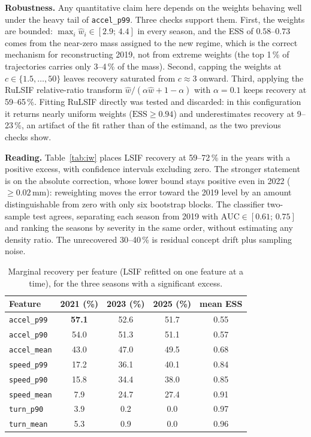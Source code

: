 \documentclass[conference]{IEEEtran}
\begin{document}
\textbf{Robustness.}
Any quantitative claim here depends on the weights behaving well under the
heavy tail of \texttt{accel\_p99}. Three checks support them. First, the
weights are bounded: $\max_i \hat{w}_i \in [2.9;\,4.4]$ in every season, and
the ESS of $0.58$--$0.73$ comes from the near-zero mass assigned to the new
regime, which is the correct mechanism for reconstructing 2019, not from
extreme weights (the top 1\,\% of trajectories carries only 3--4\,\% of the
mass). Second, capping the weights at $c \in \{1.5,\ldots,50\}$ leaves recovery
saturated from $c \approx 3$ onward. Third, applying the RuLSIF relative-ratio
transform $\hat{w}/(\alpha\hat{w}+1-\alpha)$ with $\alpha = 0.1$ keeps recovery
at 59--65\,\%. Fitting RuLSIF directly was tested and discarded: in this
configuration it returns nearly uniform weights ($\mathrm{ESS} \geq 0.94$) and
underestimates recovery at 9--23\,\%, an artifact of the fit rather than of the
estimand, as the two previous checks show.

\textbf{Reading.}
Table~\ref{tab:iw} places LSIF recovery at 59--72\,\% in the years with a
positive excess, with confidence intervals excluding zero. The stronger
statement is on the absolute correction, whose lower bound stays positive even
in 2022 ($\geq 0.02$\,mm): reweighting moves the error toward the 2019 level by
an amount distinguishable from zero with only six bootstrap blocks. The
classifier two-sample test agrees, separating each season from 2019 with
$\mathrm{AUC} \in [0.61;\,0.75]$ and ranking the seasons by severity in the
same order, without estimating any density ratio. The unrecovered 30--40\,\% is
residual concept drift plus sampling noise.

\begin{table}[!t]
\centering
\caption{Marginal recovery per feature (LSIF refitted on one feature at a
time), for the three seasons with a significant excess.}
\label{tab:iwfeat}
\footnotesize
\begin{tabular}{lcccc}
\toprule
\textbf{Feature} & \textbf{2021 (\%)} & \textbf{2023 (\%)} & \textbf{2025 (\%)}
 & \textbf{mean ESS} \\
\midrule
\texttt{accel\_p99}  & \textbf{57.1} & 52.6 & 51.7 & 0.55 \\
\texttt{accel\_p90}  & 54.0          & 51.3 & 51.1 & 0.57 \\
\texttt{accel\_mean} & 43.0          & 47.0 & 49.5 & 0.68 \\
\texttt{speed\_p99}  & 17.2          & 36.1 & 40.1 & 0.84 \\
\texttt{speed\_p90}  & 15.8          & 34.4 & 38.0 & 0.85 \\
\texttt{speed\_mean} &  7.9          & 24.7 & 27.4 & 0.91 \\
\texttt{turn\_p90}   &  3.9          &  0.2 &  0.0 & 0.97 \\
\texttt{turn\_mean}  &  5.3          &  0.9 &  0.0 & 0.96 \\
\bottomrule
\end{tabular}
\end{table}
\end{document}
